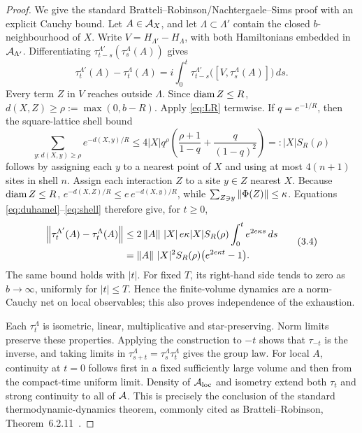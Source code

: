\begin{proof}
We give the standard Bratteli--Robinson/Nachtergaele--Sims proof with an
explicit Cauchy bound.  Let \(A\in\mathcal A_X\), and let
\(\Lambda\subset\Lambda'\) contain the closed \(b\)-neighbourhood of \(X\).
Write \(V=H_{\Lambda'}-H_\Lambda\), with both Hamiltonians embedded in
\(\mathcal A_{\Lambda'}\).  Differentiating
\(\tau_{t-s}^{\Lambda'}(\tau_s^\Lambda(A))\) gives
\[
 \tau_t^{\Lambda'}(A)-\tau_t^\Lambda(A)
 =i\int_0^t
 \tau_{t-s}^{\Lambda'}
 \bigl([V,\tau_s^\Lambda(A)]\bigr)\,ds.
\tag{3.2}\label{eq:duhamel}
\]
Every term \(Z\) in \(V\) reaches outside \(\Lambda\).  Since
\(\operatorname{diam} Z\leq R\), \(d(X,Z)\geq\rho:=\max(0,b-R)\).
Apply \eqref{eq:LR} termwise.  If \(q=e^{-1/R}\), then the square-lattice
shell bound
\[
 \sum_{y:d(X,y)\geq\rho}e^{-d(X,y)/R}
 \leq
 4|X|q^\rho
 \left(\frac{\rho+1}{1-q}+\frac{q}{(1-q)^2}\right)
 =:|X|S_R(\rho)
\tag{3.3}\label{eq:shell}
\]
follows by assigning each \(y\) to a nearest point of \(X\) and using at
most \(4(n+1)\) sites in shell \(n\).  Assign each interaction \(Z\) to a
site \(y\in Z\) nearest \(X\).  Because \(\operatorname{diam} Z\leq R\),
\(e^{-d(X,Z)/R}\leq e\,e^{-d(X,y)/R}\), while
\(\sum_{Z\ni y}\left\lVert\Phi(Z)\right\rVert\leq\kappa\).  Equations
\eqref{eq:duhamel}--\eqref{eq:shell} therefore give, for \(t\geq0\),
\[
\begin{aligned}
 \left\lVert\tau_t^{\Lambda'}(A)-\tau_t^\Lambda(A)\right\rVert
 &\leq
 2\left\lVert A\right\rVert\,|X|\,e\kappa |X|S_R(\rho)
 \int_0^t e^{2e\kappa s}\,ds\\
 &=\left\lVert A\right\rVert\,|X|^2S_R(\rho)
 \bigl(e^{2e\kappa t}-1\bigr).
\end{aligned}
\tag{3.4}\label{eq:convergence}
\]
The same bound holds with \(|t|\).  For fixed \(T\), its right-hand side
tends to zero as \(b\to\infty\), uniformly for \(|t|\leq T\).  Hence the
finite-volume dynamics are a norm-Cauchy net on local observables; this
also proves independence of the exhaustion.

Each \(\tau_t^\Lambda\) is isometric, linear, multiplicative and
star-preserving.  Norm limits preserve these properties.
Applying the construction to \(-t\) shows that \(\tau_{-t}\) is the
inverse, and taking limits in
\(\tau_{s+t}^\Lambda=\tau_s^\Lambda\tau_t^\Lambda\) gives the group law.
For local \(A\), continuity at \(t=0\) follows first in a fixed sufficiently
large volume and then from the compact-time uniform limit.  Density of
\(\mathcal A_{\rm loc}\) and isometry extend both \(\tau_t\) and strong continuity
to all of \(\mathcal A\).  This is precisely the conclusion of the standard
thermodynamic-dynamics theorem, commonly cited as
Bratteli--Robinson, Theorem~6.2.11~\cite{BR}.
\end{proof}

